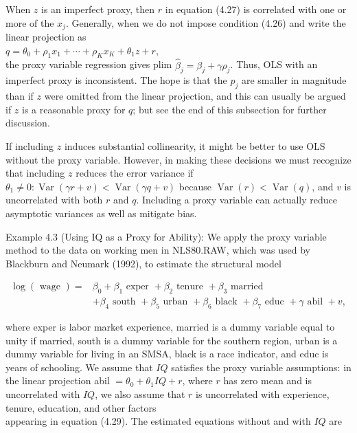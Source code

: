 \documentclass[10pt]{article}
\begin{document}
When $z$ is an imperfect proxy, then $r$ in equation (4.27) is correlated with one or more of the $x_{j}$. Generally, when we do not impose condition (4.26) and write the linear projection as\\
$q=\theta_{0}+\rho_{1} x_{1}+\cdots+\rho_{K} x_{K}+\theta_{1} z+r$,\\
the proxy variable regression gives plim $\hat{\beta}_{j}=\beta_{j}+\gamma \rho_{j}$. Thus, OLS with an imperfect proxy is inconsistent. The hope is that the $p_{j}$ are smaller in magnitude than if $z$ were omitted from the linear projection, and this can usually be argued if $z$ is a reasonable proxy for $q$; but see the end of this subsection for further discussion.

If including $z$ induces substantial collinearity, it might be better to use OLS without the proxy variable. However, in making these decisions we must recognize that including $z$ reduces the error variance if $\theta_{1} \neq 0: \operatorname{Var}(\gamma r+v)<\operatorname{Var}(\gamma q+v)$ because $\operatorname{Var}(r)<\operatorname{Var}(q)$, and $v$ is uncorrelated with both $r$ and $q$. Including a proxy variable can actually reduce asymptotic variances as well as mitigate bias.

Example 4.3 (Using IQ as a Proxy for Ability): We apply the proxy variable method to the data on working men in NLS80.RAW, which was used by Blackburn and Neumark (1992), to estimate the structural model


\begin{align*}
\log (\text { wage })= & \beta_{0}+\beta_{1} \text { exper }+\beta_{2} \text { tenure }+\beta_{3} \text { married } \\
& +\beta_{4} \text { south }+\beta_{5} \text { urban }+\beta_{6} \text { black }+\beta_{7} \text { educ }+\gamma \text { abil }+v, \tag{4.29}
\end{align*}


where exper is labor market experience, married is a dummy variable equal to unity if married, south is a dummy variable for the southern region, urban is a dummy variable for living in an SMSA, black is a race indicator, and educ is years of schooling. We assume that $I Q$ satisfies the proxy variable assumptions: in the linear projection abil $=\theta_{0}+\theta_{1} I Q+r$, where $r$ has zero mean and is uncorrelated with $I Q$, we also assume that $r$ is uncorrelated with experience, tenure, education, and other factors\\
appearing in equation (4.29). The estimated equations without and with $I Q$ are
\end{document}

